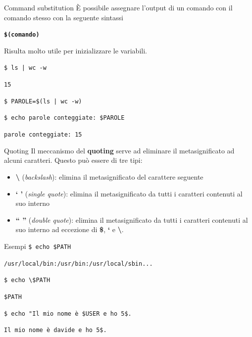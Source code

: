 \documentclass{beamer}
\begin{document}
    \begin{frame}{Command substitution}
        È possibile assegnare l'output di un comando con il
        comando stesso con la seguente sintassi

        \begin{center}
            \texttt{\textbf{\$(comando)}}
        \end{center}

        Risulta molto utile per inizializzare le variabili.

        \begin{exampleblock}{}
            \small

            \texttt{\$ ls | wc -w}

            \texttt{15}

            \vspace{0.5cm}

            \texttt{\$ PAROLE=\$(ls | wc -w)}

            \vspace{0.5cm}

            \texttt{\$ echo parole conteggiate: \$PAROLE}

            \texttt{parole conteggiate: 15}
        \end{exampleblock}
    \end{frame}

    \begin{frame}{Quoting}
        Il meccanismo del \textbf{quoting} serve ad eliminare il metasignificato
        ad alcuni caratteri. Questo può essere di tre tipi:
        \begin{itemize}
            \item \textbf{\textbackslash} (\textit{backslash}): elimina il metasignificato del carattere seguente
            \item \textbf{` '} (\textit{single quote}): elimina il metasignificato da tutti i caratteri contenuti al suo interno
            \item \textbf{`` ''} (\textit{double quote}): elimina il metasignificato da tutti i caratteri contenuti al suo interno ad eccezione di \textbf{\$}, \textbf{`} e \textbf{\textbackslash}.
        \end{itemize}

        \begin{exampleblock}{Esempi}
            \scriptsize
            \texttt{\$ echo \$PATH}
            
            \texttt{/usr/local/bin:/usr/bin:/usr/local/sbin...}

            \texttt{\$ echo \textbackslash\$PATH}

            \texttt{\$PATH}

            \vspace{0.25cm}

            \texttt{\$ echo "Il mio nome è \$USER e ho 5\$.}

            \texttt{Il mio nome è davide e ho 5\$.}
        \end{exampleblock}
    \end{frame}
\end{document}
